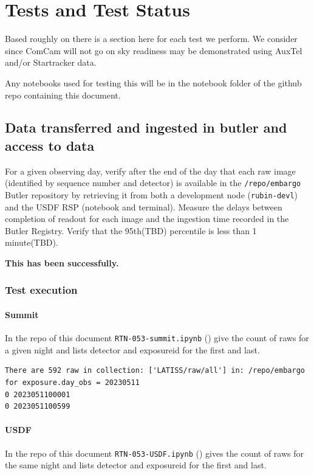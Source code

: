 \section{Tests and Test Status} \label{sec:testing}
Based roughly on  there is a section here for each test we perform.
We consider since ComCam will not go on sky readiness may be demonstrated using AuxTel and/or Startracker data.

Any notebooks used for testing this will be in the notebook folder of the github repo containing this document.

\subsection{Data transferred and ingested in butler and access to data}
For a given observing day, verify after the end of the day that each raw image (identified by sequence number and detector) is available in the \texttt{/repo/embargo} Butler repository by retrieving it from both a development node (\texttt{rubin-devl}) and the USDF RSP (notebook and terminal).
Measure the delays between completion of readout for each image and the ingestion time recorded in the Butler Registry.
Verify that the 95th(TBD) percentile is less than 1 minute(TBD).

\textbf{This has been successfully.}

\subsubsection{Test execution}
\paragraph{Summit}
In the repo of this document \texttt{RTN-053-summit.ipynb} () give the count of raws for a given night and lists detector and exposureid for the first and last.

\begin{lstlisting}
There are 592 raw in collection: ['LATISS/raw/all'] in: /repo/embargo for exposure.day_obs = 20230511
0 2023051100001
0 2023051100599
\end{lstlisting}

\paragraph{USDF}
In the repo of this document \texttt{RTN-053-USDF.ipynb} () gives the count of raws for the same night and lists detector and exposureid for the first and last.

